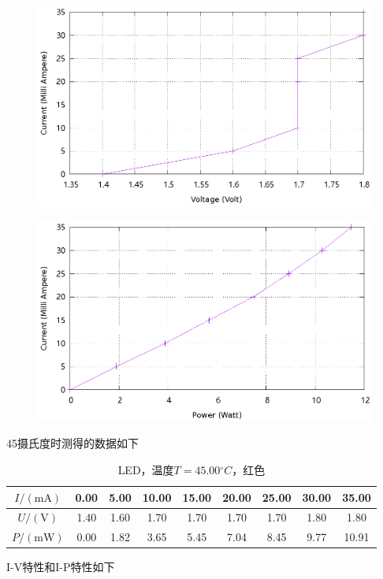 \documentclass{ctexart}
\newcommand{\si}[1]{\mathrm{#1}}
\begin{document}
\begin{figure}[H]
  \centering
  \includegraphics[width=0.8\linewidth]{optics-figures/led-vc-5.gnuplot}
\end{figure}
\begin{figure}[H]
  \centering
  \includegraphics[width=0.8\linewidth]{optics-figures/led-pc-5.gnuplot}
\end{figure}

\newpage
45摄氏度时测得的数据如下

\begin{table}[H]
  \centering
  \begin{tabular}{|c|c|c|c|c|c|c|c|c|}
    \hline
    $I/(\si{mA})$   & 0.00 & 5.00 & 10.00 & 15.00 & 20.00 & 25.00 & 30.00 & 35.00 \\\hline
    $U / (\si{V})$  & 1.40 & 1.60 & 1.70 & 1.70 & 1.70 & 1.70 & 1.80 & 1.80 \\\hline
    $P / (\si{mW})$ & 0.00 & 1.82 & 3.65 & 5.45 & 7.04 & 8.45 & 9.77 & 10.91 \\\hline
  \end{tabular}
  \caption{LED，温度$T=45.00{}^{\circ}C$，红色}
\end{table}

I-V特性和I-P特性如下
\end{document}
